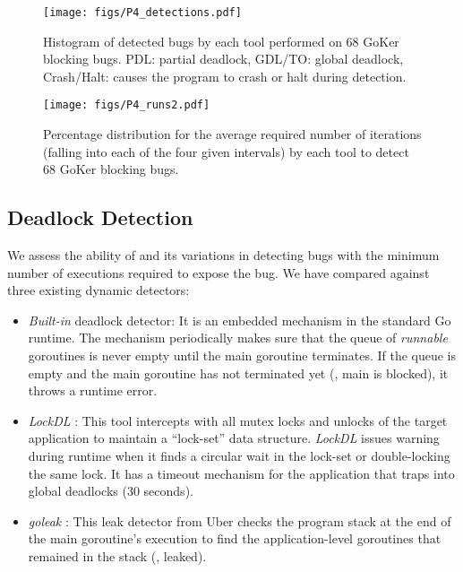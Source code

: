 \begin{figure}
\centering
  \texttt{[image: figs/P4\_detections.pdf]}
  \caption{Histogram of detected bugs by each tool performed on 68 GoKer blocking bugs. PDL: partial deadlock, GDL/TO: global deadlock, Crash/Halt: causes the program to crash or halt during detection.}
  \label{fig:detection}
\end{figure}


\begin{figure}
\centering
  \texttt{[image: figs/P4\_runs2.pdf]}
  \caption{Percentage distribution for the average required number of iterations (falling into each of the four given intervals) by each tool to detect 68 GoKer blocking bugs.}
  \label{fig:runs}
\end{figure}


%

\subsection{Deadlock Detection}
\label{sec:dl_evaluation}
We assess the ability of \goat and its variations in detecting bugs with the minimum number of executions required to expose the bug.
%
We have compared \goat against three existing dynamic detectors:
\begin{itemize}
  \item \textit{Built-in} deadlock detector: It is an embedded mechanism in the standard Go runtime. The mechanism periodically makes sure that the queue of \textit{runnable} goroutines is never empty until the main goroutine terminates. If the queue is empty and the main goroutine has not terminated yet (\ie, main is blocked), it throws a runtime error.
  \item \textit{LockDL} \cite{lockdl}: This tool intercepts with all mutex locks and unlocks of the target application to maintain a ``lock-set'' data structure. \textit{LockDL} issues warning during runtime when it finds a circular wait in the lock-set or double-locking the same lock. It has a timeout mechanism for the application that traps into global deadlocks (30 seconds).
  \item \textit{goleak} \cite{goleak}: This leak detector from Uber checks the program stack at the end of the main goroutine's execution to find the application-level goroutines that remained in the stack (\ie, leaked).
\end{itemize}


